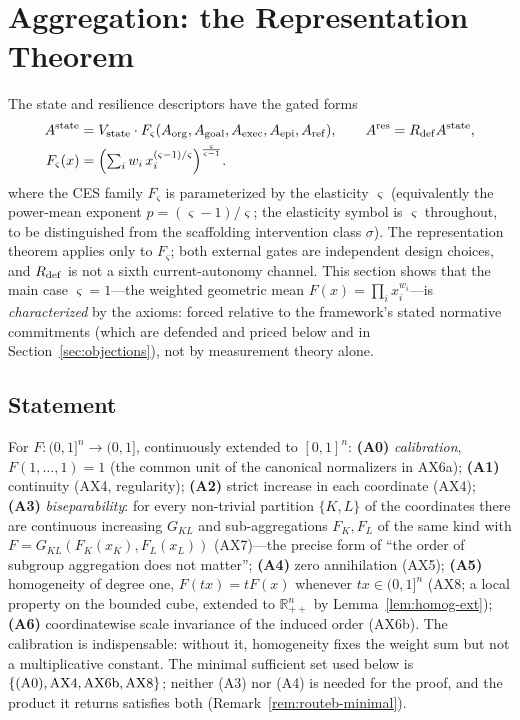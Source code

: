 \section{Aggregation: the Representation Theorem}\label{sec:representation}

The state and resilience descriptors have the gated forms
\begin{align}\label{eq:composite}
A^{\mathrm{state}} &= V_{\mathrm{state}}\cdot F_\varsigma(A_{\mathrm{org}},A_{\mathrm{goal}},A_{\mathrm{exec}},A_{\mathrm{epi}},A_{\mathrm{ref}}),\qquad
A^{\mathrm{res}}=R_{\mathrm{def}}A^{\mathrm{state}},\notag\\
F_\varsigma(x) &= \Bigl(\textstyle\sum_i w_i\,x_i^{(\varsigma-1)/\varsigma}\Bigr)^{\frac{\varsigma}{\varsigma-1}} .
\end{align}
where the CES family $F_\varsigma$ is parameterized by the elasticity
$\varsigma$ (equivalently the power-mean exponent $p=(\varsigma-1)/\varsigma$;
the elasticity symbol is $\varsigma$ throughout, to be distinguished from the
scaffolding intervention class $\sigma$). The representation theorem applies
only to $F_\varsigma$; both external gates are independent design choices, and
$R_{\mathrm{def}}$ is not a sixth current-autonomy channel. This section
shows that the main case $\varsigma=1$---the weighted geometric mean
$F(x)=\prod_i x_i^{w_i}$---is \emph{characterized} by the axioms:
forced relative to the framework's stated normative commitments (which are
defended and priced below and in Section~\ref{sec:objections}), not by
measurement theory alone.

\subsection{Statement}

\begin{definition}[(A0)--(A6)]\label{def:a16}
For $F:(0,1]^n\to(0,1]$, continuously extended to $[0,1]^n$:
\textbf{(A0)} \emph{calibration}, $F(1,\ldots,1)=1$ (the common unit of the
canonical normalizers in AX6a); \textbf{(A1)} continuity (AX4, regularity);
\textbf{(A2)} strict increase in each coordinate (AX4);
\textbf{(A3)} \emph{biseparability}: for every non-trivial partition
$\{K,L\}$ of the coordinates there are continuous increasing $G_{KL}$ and
sub-aggregations $F_K,F_L$ of the same kind with
$F=G_{KL}(F_K(x_K),F_L(x_L))$ (AX7)---the precise form of ``the order of
subgroup aggregation does not matter''; \textbf{(A4)} zero annihilation (AX5);
\textbf{(A5)} homogeneity of degree one, $F(tx)=tF(x)$ whenever
$tx\in(0,1]^n$ (AX8; a local property on the bounded cube, extended to
$\mathbb{R}_{++}^n$ by Lemma~\ref{lem:homog-ext}); \textbf{(A6)}
coordinatewise scale invariance of the induced order (AX6b). The calibration
is indispensable: without it, homogeneity fixes the weight sum but not a
multiplicative constant. The minimal sufficient set used below is
$\{\textup{(A0)},\textup{AX4},\textup{AX6b},\textup{AX8}\}$; neither (A3)
nor (A4) is needed for the proof, and the product it returns satisfies both
(Remark~\ref{rem:routeb-minimal}).
\end{definition}

